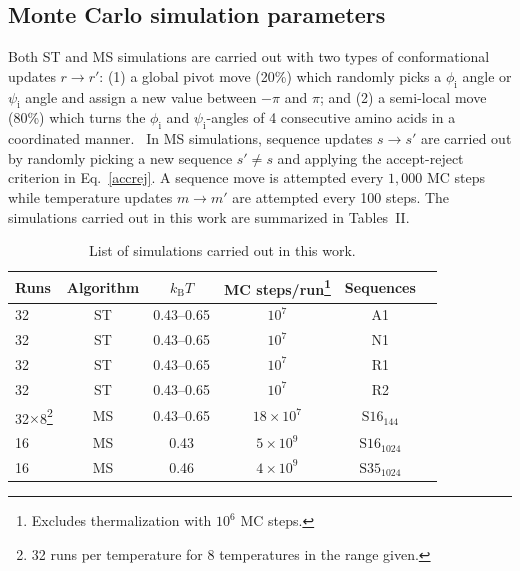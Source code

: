 \documentclass[
aip,
rsi,%
amsmath,amssymb,
reprint,%
]{revtex4-1}
\newcommand	 {\sbar}	{{s}}
\newcommand	 {\rbar}	{{r}}
\newcommand	 {\kb}		{{k_\mathrm{B}}}
\begin{document}
\subsection{Monte Carlo simulation parameters}
\noindent
Both ST and MS simulations are carried out with two types of conformational updates $\rbar\rightarrow\rbar'$: (1) a global pivot move (20\%) which randomly picks a $\phi_\mathrm{i}$ angle or $\psi_\mathrm{i}$ angle and assign a new value between $-\pi$ and $\pi$; and (2) a semi-local move (80\%) which turns the $\phi_\mathrm{i}$ and $\psi_\mathrm{i}$-angles of 4 consecutive amino acids in a coordinated manner.~\cite{Favrin2001} In MS simulations, sequence updates $\sbar\rightarrow\sbar'$ are carried out by randomly picking a new sequence $\sbar'\ne\sbar$ and applying the accept-reject criterion in Eq.~\ref{accrej}. A sequence move is attempted every $1,000$ MC steps while temperature updates $m\rightarrow m'$ are attempted every 100 steps. The simulations carried out in this work are summarized in Tables~II.

\begin{table}
\caption{\label{tab2} List of simulations carried out in this work. }
\begin{ruledtabular}
\begin{tabular}{lccccr}
Runs & Algorithm & $\kb T$  & MC steps/run\footnote{Excludes thermalization with $10^6$ MC steps.} &  Sequences\\
\hline
32 & ST & 0.43--0.65 & $10^7$ &A1\\ 
32 & ST & 0.43--0.65 & $10^7$ &N1\\ 
32 & ST & 0.43--0.65 & $10^7$ &R1\\ 
32 & ST & 0.43--0.65 & $10^7$ &R2\\ 
32$\times$8\footnote{32  runs per temperature for 8 temperatures in the range given.} & MS &0.43--0.65& $18\times 10^7$ & $\mathrm{S16}_{144}$\\
16 & MS & 0.43  & $5\times 10^9$ &  $\mathrm{S16}_{1024}$ \\
16 & MS & 0.46 & $4\times 10^9$ &  $\mathrm{S35}_{1024}$ \\
\end{tabular}
\end{ruledtabular}
\end{table}
\end{document}
